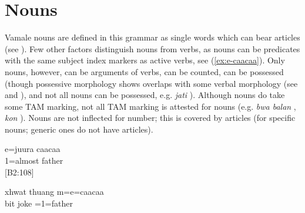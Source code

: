 \chapter{Nouns} 
\label{ChapterNouns} 

Vamale nouns are defined in this grammar as single words which can bear articles (see ). Few other factors distinguish nouns from verbs, as nouns can be predicates with the same subject index markers as active verbs, see (\ref{ex:e-caacaa}). Only nouns, however, can be arguments of verbs, can be counted, can be possessed (though possessive morphology shows overlaps with some verbal morphology (see  and ), and not all nouns can be possessed, e.g. \textit{jati} ). Although nouns do take some TAM marking, not all TAM marking is attested for nouns (e.g. \textit{bwa balan} , \textit{kon} ). Nouns are not inflected for number; this is covered by articles (for specific nouns; generic ones do not have articles).

	\ea 
	\label{ex:e-caacaa}
	\gll e=juura caacaa\\
	 1=almost father\\
	\glt {} {[B2:108]}
	 \z
	
	\ea
	\gll xhwat thuang m=e=caacaa\\
	 bit joke =1=father\\
	\glt {}
	\z


